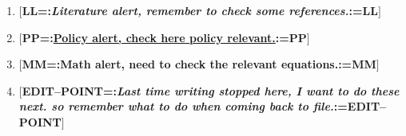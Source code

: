 \documentclass[12pt,english]{article}
\begin{document}
\newcommand{\AlertStr}{=:}
\newcommand{\AlertEnd}{:=}
\newcommand{\AlertLit}[1]{$\Big[$\textbf{LL\AlertStr}\emph{\textbf{\textcolor{ceruleanblue}{#1}}}\textbf{\AlertEnd LL}$\Big]$}
\newcommand{\AlertPol}[1]{$\Big[$\textbf{PP\AlertStr}\underline{\textbf{\textcolor{bronze}{#1}}}\textbf{\AlertEnd PP}$\Big]$}
\newcommand{\AlertMath}[1]{$\Big[$\textbf{MM\AlertStr}\thinspace\textbf{\textcolor{brightmaroon}{#1}}\textbf{\AlertEnd MM}$\Big]$}
\newcommand{\AlertEdit}[1]{$\Big[$\textbf{EDIT--POINT\AlertStr}\emph{\textbf{\textcolor{dartmouthgreen}{#1}}}\textbf{\AlertEnd EDIT--POINT}$\Big]$}

\begin{enumerate}
  \item \AlertLit{Literature alert, remember to check some references.}
  \item \AlertPol{Policy alert, check here policy relevant.}
  \item \AlertMath{Math alert, need to check the relevant equations.}
  \item \AlertEdit{Last time writing stopped here, I want to do these next. so remember what to do when coming back to file.}
\end{enumerate}
\end{document}
